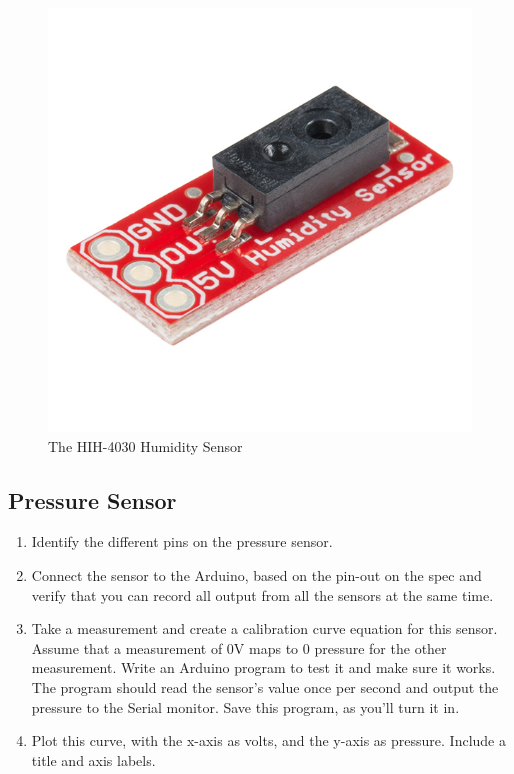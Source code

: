 \documentclass[12pt]{article}
\begin{document}
		\begin{figure}[h]
			\begin{center}
				\includegraphics[scale=0.75]{Figures/HIH4030.jpg}
				\caption{The HIH-4030 Humidity Sensor}
			\end{center}
		\end{figure}
	
	\newpage
	\subsection*{Pressure Sensor}
	\begin{enumerate}
		\item Identify the different pins on the pressure sensor.
		
		\item  Connect the sensor to the Arduino, based on the pin-out on the spec and verify that you can record all output from all the sensors at the same time.
		
		\item Take a measurement and create a calibration curve equation for this sensor. Assume that a measurement of 0V maps to 0 pressure for the other measurement. Write an Arduino program to test it and make sure it works. The program should read the sensor's value once per second and output the pressure to the Serial monitor. Save this program, as you'll turn it in.
		
		\item Plot this curve, with the x-axis as volts, and the y-axis as pressure. Include a title and axis labels.
		
	\end{enumerate}
\end{document}
